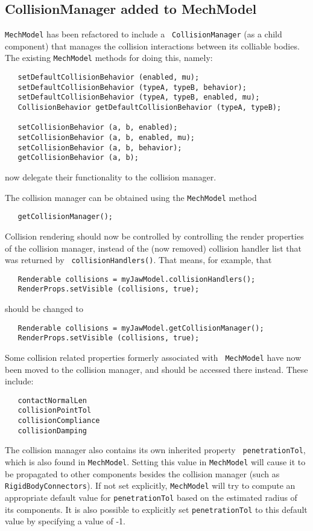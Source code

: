 \documentclass{article}
\begin{document}
\subsection*{CollisionManager added to MechModel}

{\tt MechModel} has been refactored to include a {\tt
CollisionManager} (as a child component) that manages the collision
interactions between its colliable bodies. The existing
{\tt MechModel} methods for doing this, namely:
\begin{lstlisting}
   setDefaultCollisionBehavior (enabled, mu);
   setDefaultCollisionBehavior (typeA, typeB, behavior);
   setDefaultCollisionBehavior (typeA, typeB, enabled, mu);
   CollisionBehavior getDefaultCollisionBehavior (typeA, typeB);

   setCollisionBehavior (a, b, enabled);
   setCollisionBehavior (a, b, enabled, mu);
   setCollisionBehavior (a, b, behavior);
   getCollisionBehavior (a, b);
\end{lstlisting}
now delegate their functionality to the collision manager.

The collision manager can be obtained using the {\tt MechModel} method
\begin{lstlisting}
   getCollisionManager();
\end{lstlisting}
Collision rendering should now be controlled by controlling the render
properties of the collision manager, instead of the (now removed)
collision handler list that was returned by {\tt
collisionHandlers()}. That means, for example, that
\begin{lstlisting}
   Renderable collisions = myJawModel.collisionHandlers();
   RenderProps.setVisible (collisions, true);
\end{lstlisting}
should be changed to 
\begin{lstlisting}
   Renderable collisions = myJawModel.getCollisionManager();
   RenderProps.setVisible (collisions, true);
\end{lstlisting}

Some collision related properties formerly associated with {\tt
MechModel} have now been moved to the collision manager, and should be
accessed there instead. These include:
\begin{lstlisting}
   contactNormalLen
   collisionPointTol
   collisionCompliance
   collisionDamping
\end{lstlisting}

The collision manager also contains its own inherited property {\tt
penetrationTol}, which is also found in {\tt MechModel}. Setting this
value in {\tt MechModel} will cause it to be propagated to other
components besides the collision manager (such as {\tt
RigidBodyConnectors}). If not set explicitly, {\tt MechModel} will try
to compute an appropriate default value for {\tt penetrationTol} based
on the estimated radius of its components.  It is also possible to
explicitly set {\tt penetrationTol} to this default value by
specifying a value of -1.
\end{document}

